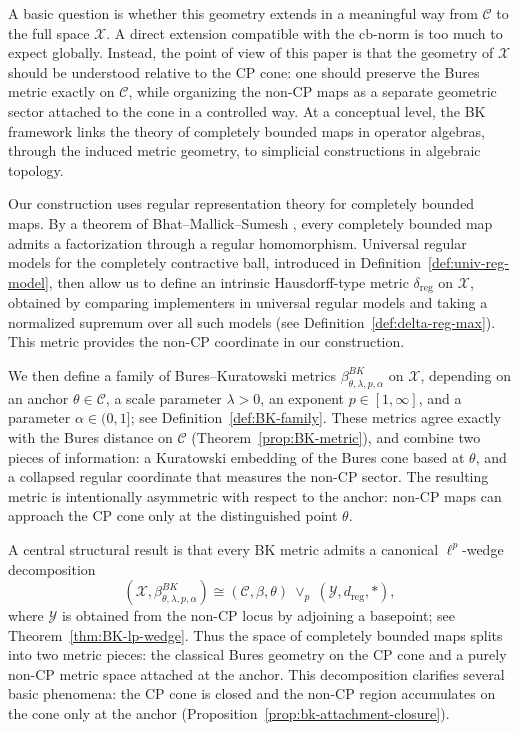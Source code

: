 \documentclass[11pt]{amsart}
\theoremstyle{definition}
\theoremstyle{remark}
\newcommand{\1}{\mathbbm{1}}
\begin{document}
A basic question is whether this geometry extends in a meaningful way from
$\mathcal C$ to the full space $\mathcal X$. A direct extension compatible with
the cb-norm is too much to expect globally. Instead, the point of view of this
paper is that the geometry of $\mathcal X$ should be understood relative
to the CP cone: one should preserve the Bures metric exactly on $\mathcal C$,
while organizing the non-CP maps as a separate geometric sector attached to the
cone in a controlled way. At a conceptual level, the BK framework links the theory of completely bounded
maps in operator algebras, through the induced metric geometry, to simplicial
constructions in algebraic topology.

Our construction uses regular representation theory for completely bounded maps.
By a theorem of Bhat--Mallick--Sumesh \cite{BMS2017}, every completely bounded
map admits a factorization through a regular homomorphism. Universal regular
models for the completely contractive ball, introduced in Definition~\ref{def:univ-reg-model}, then allow us to define an intrinsic
Hausdorff-type metric $\delta_{\mathrm{reg}}$ on $\mathcal X$, obtained by
comparing implementers in universal regular models and taking a normalized
supremum over all such models (see Definition~\ref{def:delta-reg-max}). This metric provides the non-CP coordinate in
our construction.

We then define a family of Bures--Kuratowski metrics $\beta^{BK}_{\theta,\lambda,p,\alpha}$
on $\mathcal X$, depending on an anchor $\theta\in\mathcal C$, a scale
parameter $\lambda>0$, an exponent $p\in[1,\infty]$, and a parameter
$\alpha\in(0,1]$; see Definition~\ref{def:BK-family}. These metrics agree exactly with the Bures distance on
$\mathcal C$  (Theorem~\ref{prop:BK-metric}), and combine two pieces of information: a Kuratowski embedding \cite{Kuratowski} of
the Bures cone based at $\theta$, and a collapsed regular coordinate that
measures the non-CP sector. The resulting metric is intentionally asymmetric
with respect to the anchor: non-CP maps can approach the CP cone only at the
distinguished point $\theta$.

A central structural result is that every BK metric admits a canonical
$\ell^p$-wedge decomposition
\[
(\mathcal X,\beta^{BK}_{\theta,\lambda,p,\alpha})
\cong
(\mathcal C,\beta,\theta)\ \vee_p\ (\mathcal Y,d_{\mathrm{reg}},\ast),
\]
where $\mathcal Y$ is obtained from the non-CP locus by adjoining a basepoint; see Theorem~\ref{thm:BK-lp-wedge}.
Thus the space of completely bounded maps splits into two metric pieces: the
classical Bures geometry on the CP cone and a purely non-CP metric space
attached at the anchor. This decomposition clarifies several basic phenomena:
the CP cone is closed and the non-CP region accumulates on the cone only at the
anchor (Proposition~\ref{prop:bk-attachment-closure}).
\end{document}
